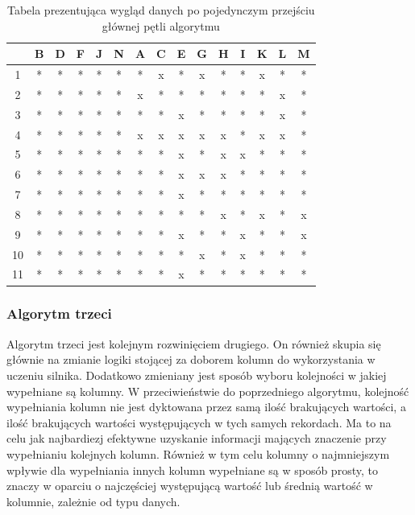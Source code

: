 \documentclass[12pt,twoside]{article}
\begin{document}
\begin{enumerate}[label=\arabic*), leftmargin=1.25cm]
          \begin{table}[ht]
              \caption{Tabela prezentująca wygląd danych po pojedynczym przejściu głównej pętli algorytmu}
              \centering
              \begin{tabular}{|c|c|c|c|c|c|c|c|c|c|c|c|c|c|c|}
                  \hline
                     & B & D & F & J & N & A & C & E & G & H & I & K & L & M \\ \hline
                  1  & * & * & * & * & * & * & x & * & x & * & * & x & * & * \\ \hline
                  2  & * & * & * & * & * & x & * & * & * & * & * & * & x & * \\ \hline
                  3  & * & * & * & * & * & * & * & x & * & * & * & * & x & * \\ \hline
                  4  & * & * & * & * & * & x & x & x & x & x & * & x & x & * \\ \hline
                  5  & * & * & * & * & * & * & * & x & * & x & x & * & * & * \\ \hline
                  6  & * & * & * & * & * & * & * & x & x & x & * & * & * & * \\ \hline
                  7  & * & * & * & * & * & * & * & x & * & * & * & * & * & * \\ \hline
                  8  & * & * & * & * & * & * & * & * & * & x & * & x & * & x \\ \hline
                  9  & * & * & * & * & * & * & * & x & * & * & x & * & * & x \\ \hline
                  10 & * & * & * & * & * & * & * & * & x & * & x & * & * & * \\ \hline
                  11 & * & * & * & * & * & * & * & x & * & * & * & * & * & * \\ \hline
              \end{tabular}
              \label{tab:2_end}
          \end{table}
          \FloatBarrier

\end{enumerate}
\subsubsection{Algorytm trzeci}

Algorytm trzeci jest kolejnym rozwinięciem drugiego. On również skupia się głównie na zmianie logiki
stojącej za doborem kolumn do wykorzystania w uczeniu silnika.
Dodatkowo zmieniany jest sposób wyboru kolejności w jakiej wypełniane są kolumny.
W przeciwieństwie do poprzedniego algorytmu, kolejność wypełniania kolumn nie jest dyktowana przez samą ilość
brakujących wartości, a ilość brakujących wartości występujących w tych samych rekordach.
Ma to na celu jak najbardiezj efektywne uzyskanie informacji mających znaczenie przy wypełnianiu kolejnych kolumn.
Również w tym celu kolumny o najmniejszym wpływie dla wypełniania innych kolumn wypełniane są w sposób prosty,
to znaczy w oparciu o najczęściej występującą wartość lub średnią wartość w kolumnie, zależnie od typu danych.
\end{document}
